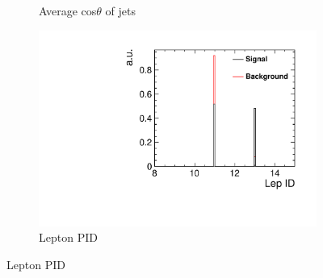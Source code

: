\begin{figure}[h]
\begin{subfigure}[]{0.5\linewidth}
    \caption{Average cos$\theta$ of jets} 
  \end{subfigure}%
  \begin{subfigure}[]{0.5\linewidth}
    \centering
    \includegraphics[width=0.75\linewidth]{Appendix/figures/LepID} 
    \caption{Lepton PID} 
  \end{subfigure}
\end{figure}


